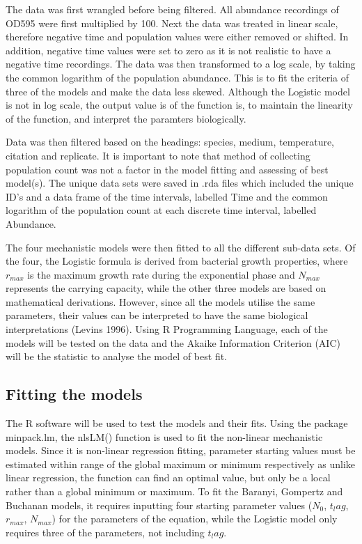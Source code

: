 The data was first wrangled before being filtered. All abundance recordings of OD595 were first multiplied by 100. Next the data was treated in linear scale, therefore negative time and population values were either removed or shifted. In addition, negative time values were set to zero as it is not realistic to have a negative time recordings. The data was then transformed to a log scale, by taking the common logarithm of the population abundance. This is to fit the criteria of three of the models and make the data less skewed. Although the Logistic model is not in log scale, the output value is of the function is, to maintain the linearity of the function, and interpret the paramters biologically.

Data was then filtered based on the headings: species, medium, temperature, citation and replicate. It is important to note that method of collecting population count was not a factor in the model fitting and assessing of best model(s). The unique data sets were saved in .rda files which included the unique ID’s and a data frame of the time intervals, labelled Time and the common logarithm of the population count at each discrete time interval, labelled Abundance.

The four mechanistic models were then fitted to all the different sub-data sets. Of the four, the Logistic formula is derived from bacterial growth properties, where $r_{max}$ is the maximum growth rate during the exponential phase and $N_{max}$ represents the carrying capacity, while the other three models are based on mathematical derivations. However, since all the models utilise the same parameters, their values can be interpreted to have the same biological interpretations (Levins 1996). Using R Programming Language, each of the models will be tested on the data and the Akaike Information Criterion (AIC) will be the statistic to analyse the model of best fit.

\subsection{Fitting the models}

The R software will be used to test the models and their fits. Using the package minpack.lm, the nlsLM() function is used to fit the non-linear mechanistic models. Since it is non-linear regression fitting, parameter starting values must be estimated within range of the global maximum or minimum respectively as unlike linear regression, the function can find an optimal value, but only be a local rather than a global minimum or maximum. To fit the Baranyi, Gompertz and Buchanan models, it requires inputting four starting parameter values ($N_0$, $t_lag$, $r_{max}$, $N_{max}$) for the parameters of the equation, while the Logistic model only requires three of the parameters, not including $t_lag$.

